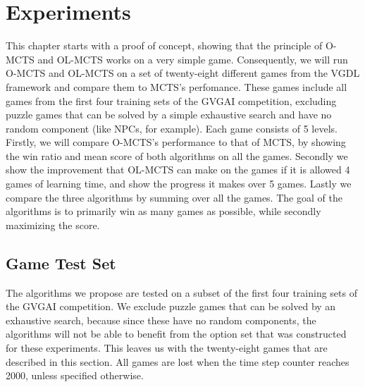 \chapter{Experiments}
\label{sec:experiments}
This chapter starts with a proof of concept, showing that the principle of
O-MCTS and OL-MCTS works on a very simple game. Consequently, we will run O-MCTS
and OL-MCTS on a set of twenty-eight different games from the VGDL framework and
compare them to MCTS's perfomance.  These games include all games from the first
four training sets of the GVGAI competition, excluding puzzle games that can be
solved by a simple exhaustive search and have no random component (like NPCs,
for example). Each game consists of 5 levels. Firstly, we will compare O-MCTS's
performance to that of MCTS, by showing the win ratio and mean score of both
algorithms on all the games.  Secondly we show the improvement that OL-MCTS can
make on the games if it is allowed 4 games of learning time, and show the
progress it makes over 5 games.  Lastly we compare the three algorithms by
summing over all the games.  The goal of the algorithms is to primarily win as
many games as possible, while secondly maximizing the score. 


\section{Game Test Set}
\label{subsec:games}
The algorithms we propose are tested on a subset of the first four training sets
of the GVGAI competition. We exclude puzzle games that can be solved by an
exhaustive search, because since these have no random components, the algorithms
will not be able to benefit from the option set that was constructed for these
experiments. This leaves us with the twenty-eight games that are described in
this section. All games are lost when the time step counter reaches 2000, unless
specified otherwise.

